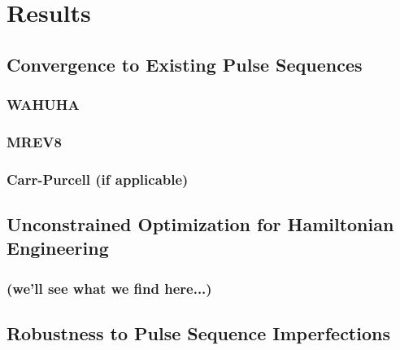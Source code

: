 \chapter{Results}


\section{Convergence to Existing Pulse Sequences}


\subsection{WAHUHA}

\subsection{MREV8}

\subsection{Carr-Purcell (if applicable)}



\section{Unconstrained Optimization for Hamiltonian Engineering}

\subsection{(we'll see what we find here...)}


\section{Robustness to Pulse Sequence Imperfections}
